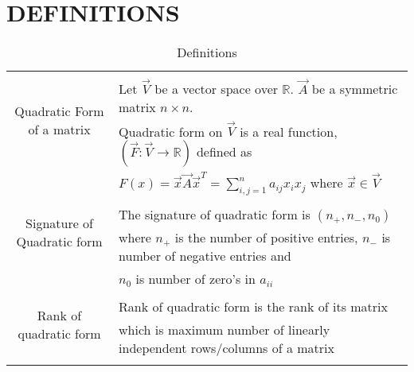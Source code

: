 \documentclass[journal,12pt]{IEEEtran}
\begin{document}
\section{DEFINITIONS}
\renewcommand{\thetable}{1}
\begin{longtable}{|c|l|}
    \hline
	\multirow{3}{*}{Quadratic Form of a matrix} 
	& \\
	& Let $\vec{V}$ be a vector space over $\mathbb{R}$. $\vec{A}$ be a symmetric matrix $n\times n$.\\& Quadratic form on $\vec{V}$ is a real function, $(\vec{F}:\vec{V}\rightarrow\mathbb{R})$ defined as 
	\\& $F(x)= \vec{x}\vec{A}\vec{x}^T= \sum_{i,j=1}^{n}a_{ij}x_ix_j$  where $\vec{x} \in \vec{V}$ \\

	\hline
	\multirow{3}{*}{Signature of Quadratic form} 
	& \\
	& The signature of quadratic form is $(n_{+},n_{-},n_{0})$ \\ & where $n_{+}$ is the number of positive entries, $n_{-}$ is number of negative entries and \\ & $n_{0}$ is number of zero's in $a_{ii}$ \\
	\hline
	\multirow{3}{*}{Rank of quadratic form} 
	& \\
	& Rank of quadratic form is the rank of its matrix \\
	& which is maximum number of linearly independent rows/columns of a matrix \\
	\hline
	\caption{Definitions}
    \label{Table.1}
\end{longtable}
\end{document}
